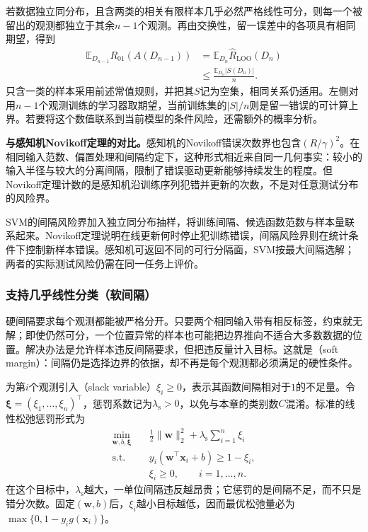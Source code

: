 若数据独立同分布，且含两类的相关有限样本几乎必然严格线性可分，则每一个被留出的观测都独立于其余$n-1$个观测。再由交换性，留一误差中的各项具有相同期望，得到
\begin{equation}
  \begin{aligned}
    \mathbb{E}_{D_{n-1}}R_{01}(A(D_{n-1}))
      &=\mathbb{E}_{D_n}\widehat R_{\mathrm{LOO}}(D_n)\\
      &\le\frac{\mathbb{E}_{D_n}|S(D_n)|}{n}.
  \end{aligned}
  \label{eq:classification-svm-loo-expectation}
\end{equation}
只含一类的样本采用前述常值规则，并把其$S$记为空集，相同关系仍适用。左侧对用$n-1$个观测训练的学习器取期望，当前训练集的$|S|/n$则是留一错误的可计算上界。若要将这个数值联系到当前模型的条件风险，还需额外的概率分析。

\label{sec:classification-svm-perceptron-comparison}

\textbf{与感知机Novikoff定理的对比。}感知机的Novikoff错误次数界也包含$(R/\gamma)^2$。在相同输入范数、偏置处理和间隔约定下，这种形式相近来自同一几何事实：较小的输入半径与较大的分离间隔，限制了错误驱动更新能够持续发生的程度。但Novikoff定理计数的是感知机沿训练序列犯错并更新的次数，不是对任意测试分布的风险界。

SVM的间隔风险界加入独立同分布抽样，将训练间隔、候选函数范数与样本量联系起来。Novikoff定理说明在线更新何时停止犯训练错误，间隔风险界则在统计条件下控制新样本错误。感知机可返回不同的可行分隔面，SVM按最大间隔选解；两者的实际测试风险仍需在同一任务上评价。

\subsubsection{支持几乎线性分类（软间隔）}
\label{sec:classification-svm-soft-margin}

硬间隔要求每个观测都能被严格分开。只要两个相同输入带有相反标签，约束就无解；即使仍然可分，一个位置异常的样本也可能把边界推向不适合大多数数据的位置。解决办法是允许样本违反间隔要求，但把违反量计入目标。这就是（soft margin）：间隔仍是选择边界的依据，却不再是每个观测都必须满足的硬性条件。

为第$i$个观测引入（slack variable）$\xi_i\ge0$，表示其函数间隔相对于$1$的不足量。令$\bm{\xi}=(\xi_1,\ldots,\xi_n)^{\top}$，惩罚系数记为$\lambda_{\mathrm{s}}>0$，以免与本章的类别数$C$混淆。标准的线性松弛惩罚形式为
\begin{equation}
  \begin{aligned}
    \min_{\bm{w},b,\bm{\xi}}\quad&
      \frac12\lVert\bm{w}\rVert_2^2
       +\lambda_{\mathrm{s}}\sum_{i=1}^n\xi_i\\
    \text{s.t.}\quad&
      y_i(\bm{w}^{\top}\bm{x}_i+b)\ge1-\xi_i,\\
    &\xi_i\ge0,\qquad i=1,\ldots,n.
  \end{aligned}
  \label{eq:classification-svm-soft-primal}
\end{equation}
在这个目标中，$\lambda_{\mathrm{s}}$越大，一单位间隔违反越昂贵；它惩罚的是间隔不足，而不只是错分次数。固定$(\bm{w},b)$后，$\xi_i$越小目标越低，因而最优松弛量必为$\max\{0,1-y_i g(\bm{x}_i)\}$。

